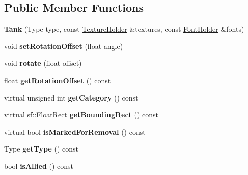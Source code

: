 \subsection*{Public Member Functions}
\begin{DoxyCompactItemize}
\item 
\hypertarget{class_tank_a416585727f18a9c471cb82a273036194}{}{\bfseries Tank} (Type type, const \hyperlink{class_resource_holder}{Texture\+Holder} \&textures, const \hyperlink{class_resource_holder}{Font\+Holder} \&fonts)\label{class_tank_a416585727f18a9c471cb82a273036194}

\item 
\hypertarget{class_tank_a5be180a933ca4e21206c1c283b7875f6}{}void {\bfseries set\+Rotation\+Offset} (float angle)\label{class_tank_a5be180a933ca4e21206c1c283b7875f6}

\item 
\hypertarget{class_tank_a3cc1280d4f77e41eed5832520e04a451}{}void {\bfseries rotate} (float offset)\label{class_tank_a3cc1280d4f77e41eed5832520e04a451}

\item 
\hypertarget{class_tank_a1e7aad0bafbebf4228f8268dc65828ad}{}float {\bfseries get\+Rotation\+Offset} () const \label{class_tank_a1e7aad0bafbebf4228f8268dc65828ad}

\item 
\hypertarget{class_tank_a2345439b017c3632bdfa3ab29b056669}{}virtual unsigned int {\bfseries get\+Category} () const \label{class_tank_a2345439b017c3632bdfa3ab29b056669}

\item 
\hypertarget{class_tank_a3b2728cc9d2385dccdc45a0c6160e5db}{}virtual sf\+::\+Float\+Rect {\bfseries get\+Bounding\+Rect} () const \label{class_tank_a3b2728cc9d2385dccdc45a0c6160e5db}

\item 
\hypertarget{class_tank_a9b1c6f05d8276c7335036575ddca2e8c}{}virtual bool {\bfseries is\+Marked\+For\+Removal} () const \label{class_tank_a9b1c6f05d8276c7335036575ddca2e8c}

\item 
\hypertarget{class_tank_ae280cab799bf1ebb08ea42648736dd1f}{}Type {\bfseries get\+Type} () const \label{class_tank_ae280cab799bf1ebb08ea42648736dd1f}

\item 
\hypertarget{class_tank_a9f48804a0a44929063b9ff9a1280e0b9}{}bool {\bfseries is\+Allied} () const \label{class_tank_a9f48804a0a44929063b9ff9a1280e0b9}


\end{DoxyCompactItemize}
